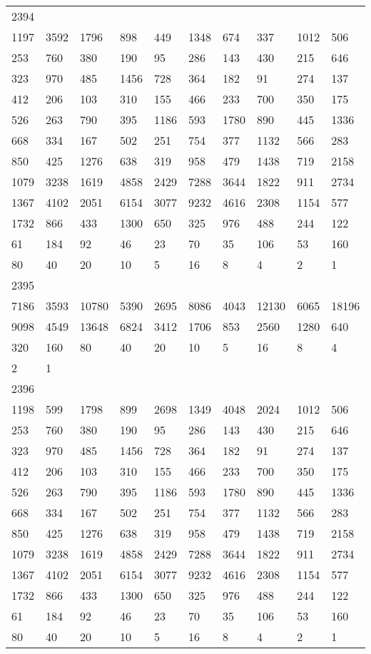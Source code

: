 \begin{longtable}{*{10}{l}}
2394&&&&&&&&&\\
1197& 3592& 1796& 898& 449& 1348& 674& 337& 1012& 506\\
253& 760& 380& 190& 95& 286& 143& 430& 215& 646\\
323& 970& 485& 1456& 728& 364& 182& 91& 274& 137\\
412& 206& 103& 310& 155& 466& 233& 700& 350& 175\\
526& 263& 790& 395& 1186& 593& 1780& 890& 445& 1336\\
668& 334& 167& 502& 251& 754& 377& 1132& 566& 283\\
850& 425& 1276& 638& 319& 958& 479& 1438& 719& 2158\\
1079& 3238& 1619& 4858& 2429& 7288& 3644& 1822& 911& 2734\\
1367& 4102& 2051& 6154& 3077& 9232& 4616& 2308& 1154& 577\\
1732& 866& 433& 1300& 650& 325& 976& 488& 244& 122\\
61& 184& 92& 46& 23& 70& 35& 106& 53& 160\\
80& 40& 20& 10& 5& 16& 8& 4& 2& 1\\

2395&&&&&&&&&\\
7186& 3593& 10780& 5390& 2695& 8086& 4043& 12130& 6065& 18196\\
9098& 4549& 13648& 6824& 3412& 1706& 853& 2560& 1280& 640\\
320& 160& 80& 40& 20& 10& 5& 16& 8& 4\\
2& 1& \\

2396&&&&&&&&&\\
1198& 599& 1798& 899& 2698& 1349& 4048& 2024& 1012& 506\\
253& 760& 380& 190& 95& 286& 143& 430& 215& 646\\
323& 970& 485& 1456& 728& 364& 182& 91& 274& 137\\
412& 206& 103& 310& 155& 466& 233& 700& 350& 175\\
526& 263& 790& 395& 1186& 593& 1780& 890& 445& 1336\\
668& 334& 167& 502& 251& 754& 377& 1132& 566& 283\\
850& 425& 1276& 638& 319& 958& 479& 1438& 719& 2158\\
1079& 3238& 1619& 4858& 2429& 7288& 3644& 1822& 911& 2734\\
1367& 4102& 2051& 6154& 3077& 9232& 4616& 2308& 1154& 577\\
1732& 866& 433& 1300& 650& 325& 976& 488& 244& 122\\
61& 184& 92& 46& 23& 70& 35& 106& 53& 160\\
80& 40& 20& 10& 5& 16& 8& 4& 2& 1\\


\end{longtable}
